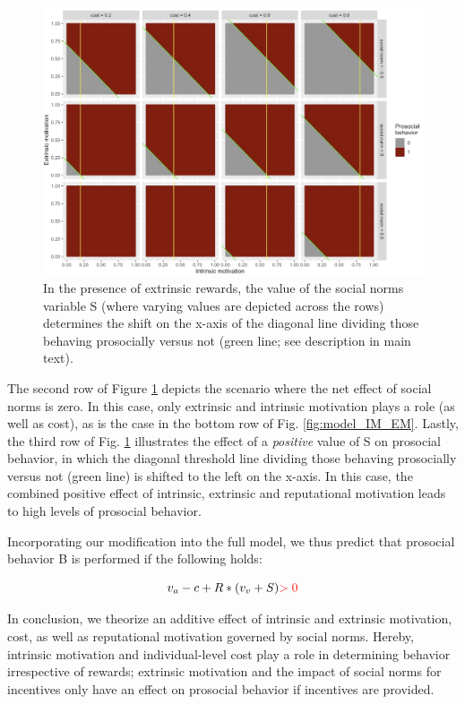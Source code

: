 \documentclass[AER]{AEA}
\begin{document}
\begin{figure}[h]
    \centering
    \includegraphics[width=\textwidth]{images/model_SOC.png}
    \caption{In the presence of extrinsic rewards, the value of the social norms variable S (where varying values are depicted across the rows) determines the shift on the x-axis of the diagonal line dividing those behaving prosocially versus not (green line; see description in main text).}
    \label{fig:model_SOC}
\end{figure}


The second row of Figure \ref{fig:model_SOC} depicts the scenario where the net effect of social norms is zero. In this case, only extrinsic and intrinsic motivation plays a role (as well as cost), as is the case in the bottom row of Fig. \ref{fig:model_IM_EM}. Lastly, the third row of Fig. \ref{fig:model_SOC} illustrates the effect of a \textit{positive} value of S on prosocial behavior, in which the diagonal threshold line dividing those behaving prosocially versus not (green line) is shifted to the left on the x-axis. In this case, the combined positive effect of intrinsic, extrinsic and reputational motivation leads to high levels of prosocial behavior.

Incorporating our modification into the full model, we thus predict that prosocial behavior B is performed if the following holds:

$$v_{a} - c + R * (v_{v}  + S) \mathbin{\color{red}> 0}$$

In conclusion, we theorize an additive effect of intrinsic and extrinsic motivation, cost, as well as reputational motivation governed by social norms. Hereby, intrinsic motivation and individual-level cost play a role in determining behavior irrespective of rewards; extrinsic motivation and the impact of social norms for incentives only have an effect on prosocial behavior if incentives are provided. 
\end{document}
